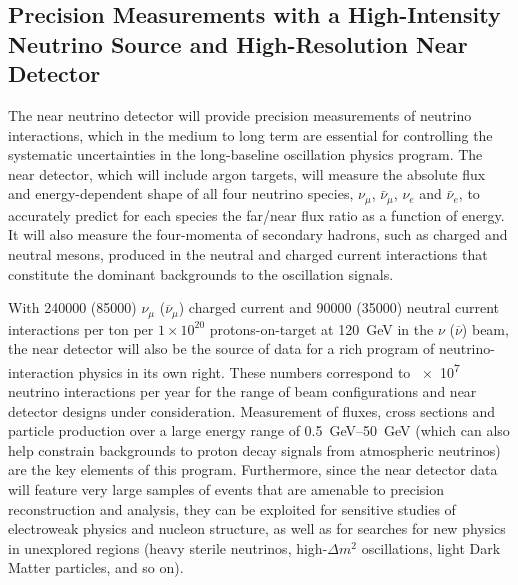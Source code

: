 %
%
\subsection{Precision Measurements with a High-Intensity Neutrino Source and High-Resolution Near Detector}


The near neutrino detector will provide precision measurements of
neutrino interactions, which in the medium to long term are essential
for controlling the systematic uncertainties in the long-baseline
oscillation physics program.  The near detector, which will include argon
targets, will measure the absolute flux and energy-dependent shape of
all four neutrino species, $\nu_\mu$, $\bar{\nu}_{\mu}$, $\nu_e$ and $\bar{\nu}_e$, to accurately
predict for each species the far/near flux ratio as a function of
energy.  It will also measure the four-momenta of secondary hadrons,
such as charged and neutral mesons, produced in the neutral and
charged current interactions that constitute the dominant backgrounds
to the oscillation signals.

With  \num{240000} (\num{85000}) $\nu_\mu$ ($\overline{\nu}_\mu$) charged current 
and \num{90000} (\num{35000})  neutral current interactions per ton per $1 \times 10^{20}$
protons-on-target at \SI{120}{GeV}  in the $\nu$ ($\overline\nu$) beam, the near detector
will also be the source of data for a rich program of neutrino-interaction 
physics in its own right.  These numbers correspond to
\num{e7}  neutrino interactions per year for the range of beam
configurations and near detector designs under consideration.
Measurement of fluxes, cross sections and particle production over a
large energy range of \SIrange{0.5}{50}{\GeV} (which can also help constrain
backgrounds to proton decay signals from atmospheric neutrinos) are the key
elements of this program.  
Furthermore, since the near detector data will feature very large
samples of events that are amenable to precision reconstruction and
analysis, they can be exploited for sensitive studies of electroweak
physics and nucleon structure, as well as for searches for new physics
in unexplored regions (heavy sterile neutrinos, high-$\Delta m^2$
oscillations, light Dark Matter particles, and so on). 

